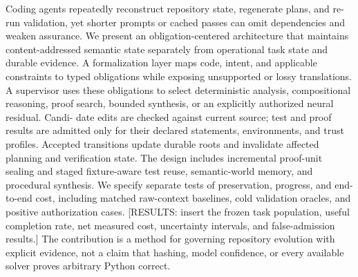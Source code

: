 Coding agents repeatedly reconstruct repository state, regenerate plans, and re-
run validation, yet shorter prompts or cached passes can omit dependencies and
weaken assurance. We present an obligation-centered architecture that maintains
content-addressed semantic state separately from operational task state and durable
evidence. A formalization layer maps code, intent, and applicable constraints to
typed obligations while exposing unsupported or lossy translations. A supervisor
uses these obligations to select deterministic analysis, compositional reasoning,
proof search, bounded synthesis, or an explicitly authorized neural residual. Candi-
date edits are checked against current source; test and proof results are admitted
only for their declared statements, environments, and trust profiles. Accepted
transitions update durable roots and invalidate affected planning and verification
state. The design includes incremental proof-unit sealing and staged fixture-aware
test reuse, semantic-world memory, and procedural synthesis. We specify separate
tests of preservation, progress, and end-to-end cost, including matched raw-context
baselines, cold validation oracles, and positive authorization cases. [RESULTS:
insert the frozen task population, useful completion rate, net measured cost,
uncertainty intervals, and false-admission results.] The contribution is a method
for governing repository evolution with explicit evidence, not a claim that hashing,
model confidence, or every available solver proves arbitrary Python correct.

